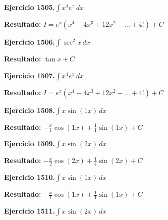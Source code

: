 \documentclass[10pt,a4paper]{article}
\begin{document}
\begin{ejbox}
\textbf{Ejercicio 1505.}\quad $\int x^{4} e^x\,dx$
\end{ejbox}

\begin{solbox}
\textbf{Resultado:} \(\displaystyle I = e^x(x^{4} - 4x^{3} + 12x^{2} - ... + 4!) + C\)
\end{solbox}

\begin{ejbox}
\textbf{Ejercicio 1506.}\quad $\int \sec^2 x\,dx$
\end{ejbox}

\begin{solbox}
\textbf{Resultado:} \(\displaystyle \tan x + C\)
\end{solbox}

\newpage
\begin{ejbox}
\textbf{Ejercicio 1507.}\quad $\int x^{4} e^x\,dx$
\end{ejbox}

\begin{solbox}
\textbf{Resultado:} \(\displaystyle I = e^x(x^{4} - 4x^{3} + 12x^{2} - ... + 4!) + C\)
\end{solbox}

\begin{ejbox}
\textbf{Ejercicio 1508.}\quad $\int x \sin(1x)\,dx$
\end{ejbox}

\begin{solbox}
\textbf{Resultado:} \(\displaystyle -\frac{x}{1}\cos(1x) + \frac{1}{1}\sin(1x) + C\)
\end{solbox}

\begin{ejbox}
\textbf{Ejercicio 1509.}\quad $\int x \sin(2x)\,dx$
\end{ejbox}

\begin{solbox}
\textbf{Resultado:} \(\displaystyle -\frac{x}{2}\cos(2x) + \frac{1}{4}\sin(2x) + C\)
\end{solbox}

\newpage
\begin{ejbox}
\textbf{Ejercicio 1510.}\quad $\int x \sin(1x)\,dx$
\end{ejbox}

\begin{solbox}
\textbf{Resultado:} \(\displaystyle -\frac{x}{1}\cos(1x) + \frac{1}{1}\sin(1x) + C\)
\end{solbox}

\begin{ejbox}
\textbf{Ejercicio 1511.}\quad $\int x \sin(2x)\,dx$
\end{ejbox}
\end{document}
